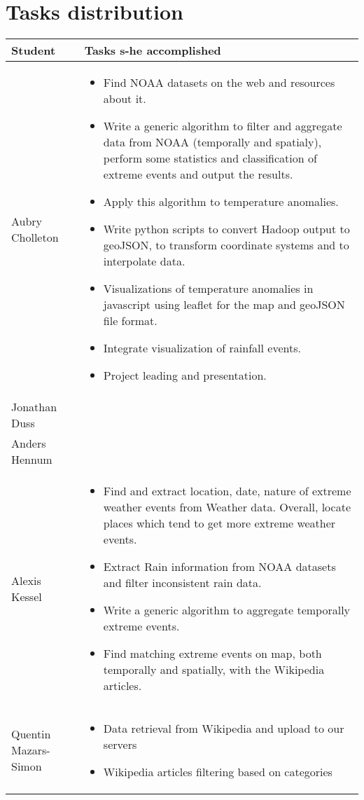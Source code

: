 \section{Tasks distribution}
\begin{longtable}{|l|p{10.5cm}|}
\hline
\textbf{Student} & \textbf{Tasks s-he accomplished} \\
\hline
Aubry Cholleton & \begin{itemize}
	\item Find NOAA datasets on the web and resources about it.
	\item Write a generic algorithm to filter and aggregate data from NOAA (temporally and spatialy), perform some statistics and classification of extreme events and output the results.
	\item Apply this algorithm to temperature anomalies.
	\item Write python scripts to convert Hadoop output to geoJSON, to transform coordinate systems and to interpolate data.
	\item Visualizations of temperature anomalies in javascript using leaflet for the map and geoJSON file format.
	\item Integrate visualization of rainfall events.
	\item Project leading and presentation.
\end{itemize}\\
\hline
Jonathan Duss & \\
\hline
Anders Hennum & \\
\hline
Alexis Kessel & \begin{itemize}
	\item Find and extract location, date, nature of extreme weather events from Weather data. Overall, locate places which tend to get more extreme weather events.
	\item Extract Rain information from NOAA datasets and filter inconsistent rain data.
	\item Write a generic algorithm to aggregate temporally extreme events.
	\item Find matching extreme events on map, both temporally and spatially, with the Wikipedia articles.
\end{itemize}\\
\hline
Quentin Mazars-Simon & \begin{itemize}
	\item Data retrieval from Wikipedia and upload to our servers
	\item Wikipedia articles filtering based on categories

\end{itemize}
\end{longtable}
